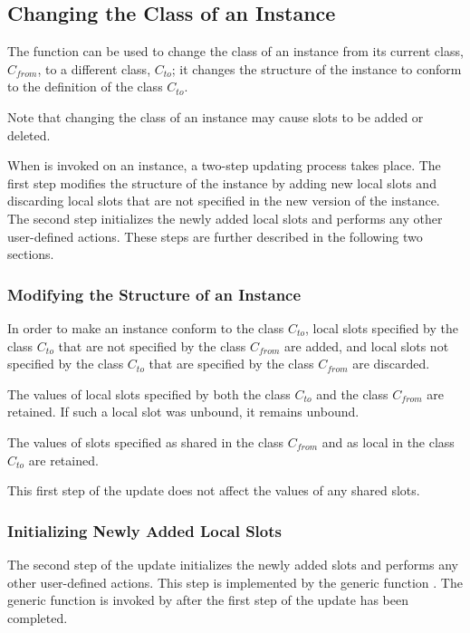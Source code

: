 \subsection{Changing the Class of an Instance}
\label{Changing-the-Class-of-an-Instance-SECTION}

The function  can be used to change the class of an
instance from its current class, $C_{from}$, to a
different class, $C_{to}$; it changes the
structure of the instance to conform to the definition of the class
$C_{to}$.

Note that changing the class of an instance may cause slots to be
added or deleted. 

When  is invoked on an instance, a two-step updating
process takes place.  The first step modifies the structure of
the instance by adding new local slots and discarding local slots that
are not specified in the new version of the instance.  The second step
initializes the newly added local slots and performs any other
user-defined actions. These steps are further described in the
following two sections.

\subsubsection{Modifying the Structure of an Instance}

In order to make an instance conform to the class $C_{to}$, local slots
specified by the class $C_{to}$ that are not specified by the class $C_{from}$
are added, and local slots not specified by 
the class $C_{to}$ that are specified by the 
class $C_{from}$ are discarded.

The values of local slots specified by both the class $C_{to}$ and the class
$C_{from}$ are retained. If such a local slot was unbound, it remains 
unbound.

The values of slots specified as shared in the class $C_{from}$ and as local in
the class $C_{to}$ are retained. 

This first step of the update does not affect the values of any shared
slots.

\subsubsection{Initializing Newly Added Local Slots}
 
The second step of the update initializes the newly added slots and
performs any other user-defined actions.  This step is implemented by
the generic function .  The
generic function  is invoked
by  after the first step of the update has been
completed.


